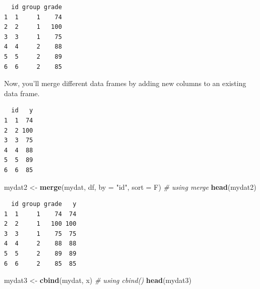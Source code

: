 \documentclass[
]{book}
\newenvironment{Shaded}{\begin{snugshade}}{\end{snugshade}}
\newcommand{\CommentTok}[1]{\textcolor[rgb]{0.56,0.35,0.01}{\textit{#1}}}
\newcommand{\DataTypeTok}[1]{\textcolor[rgb]{0.13,0.29,0.53}{#1}}
\newcommand{\DecValTok}[1]{\textcolor[rgb]{0.00,0.00,0.81}{#1}}
\newcommand{\KeywordTok}[1]{\textcolor[rgb]{0.13,0.29,0.53}{\textbf{#1}}}
\newcommand{\NormalTok}[1]{#1}
\newcommand{\OperatorTok}[1]{\textcolor[rgb]{0.81,0.36,0.00}{\textbf{#1}}}
\newcommand{\StringTok}[1]{\textcolor[rgb]{0.31,0.60,0.02}{#1}}
\begin{document}
\begin{Shaded}
\end{Shaded}

\begin{verbatim}
  id group grade
1  1     1    74
2  2     1   100
3  3     1    75
4  4     2    88
5  5     2    89
6  6     2    85
\end{verbatim}

Now, you'll merge different data frames by adding new columns to an existing data frame.

\begin{Shaded}
\end{Shaded}

\begin{verbatim}
  id   y
1  1  74
2  2 100
3  3  75
4  4  88
5  5  89
6  6  85
\end{verbatim}

\begin{Shaded}
\begin{Highlighting}[]
\NormalTok{mydat2 <-}\StringTok{ }\KeywordTok{merge}\NormalTok{(mydat, df, }\DataTypeTok{by =} \StringTok{"id"}\NormalTok{, }\DataTypeTok{sort =}\NormalTok{ F) }\CommentTok{# using merge}
\KeywordTok{head}\NormalTok{(mydat2)}
\end{Highlighting}
\end{Shaded}

\begin{verbatim}
  id group grade   y
1  1     1    74  74
2  2     1   100 100
3  3     1    75  75
4  4     2    88  88
5  5     2    89  89
6  6     2    85  85
\end{verbatim}

\begin{Shaded}
\begin{Highlighting}[]
\NormalTok{mydat3 <-}\StringTok{ }\KeywordTok{cbind}\NormalTok{(mydat, x) }\CommentTok{# using cbind()}
\KeywordTok{head}\NormalTok{(mydat3)}
\end{Highlighting}
\end{Shaded}
\end{document}
